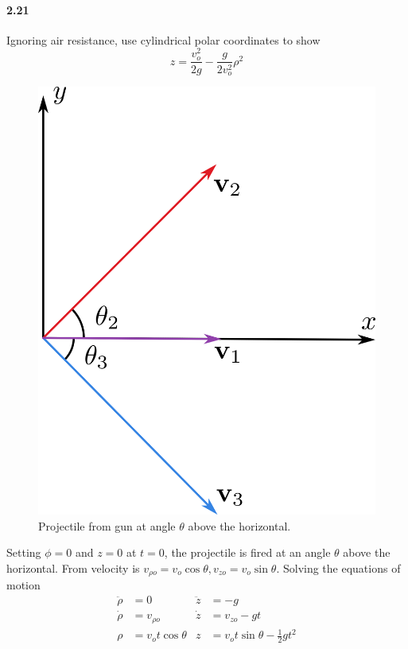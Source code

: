 \documentclass[../problems.tex]{subfiles}
\begin{document}
\paragraph{2.21} Ignoring air resistance, use cylindrical polar coordinates to show
\begin{equation*}
    z = \frac{v_o^2}{2g} - \frac{g}{2v_o^2} \rho^2
\end{equation*}
\barh
\begin{figure}[ht]
    \centering
    \includegraphics[scale=1]{fig2_21a.png}
    \caption{Projectile from gun at angle $\theta$ above the horizontal.}
    \label{fig:2_21a}
\end{figure}
Setting $\phi = 0$ and $z = 0$ at $t = 0$, the projectile is fired at an angle $\theta$ above the
horizontal. From velocity is $v_{\rho o} = v_o \cos \theta, v_{zo} = v_o \sin \theta$. Solving the
equations of motion
\begin{align*}
    \ddot \rho &= 0             & \ddot z &= -g \\
    \dot{\rho} &= v_{\rho o}    & \dot{z} &= v_{zo} - gt \\
    \rho &= v_o t \cos \theta   & z &= v_o t\sin \theta - \frac{1}{2}gt^2 \\
\end{align*}
\end{document}
